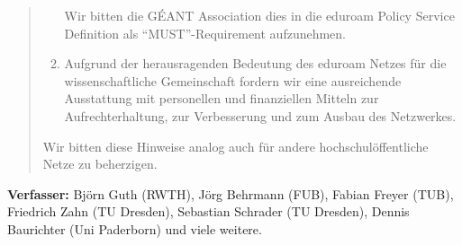 \documentclass[12pt,oneside]{scrartcl}
\begin{document}
\begin{quote}
\begin{enumerate}
    Wir bitten die GÉANT Association dies in die eduroam Policy Service Definition
    als ``MUST''-Requirement aufzunehmen.

  \item Aufgrund der herausragenden Bedeutung des eduroam Netzes für die
    wissenschaftliche Gemeinschaft fordern wir eine ausreichende Ausstattung mit
    personellen und finanziellen Mitteln zur Aufrechterhaltung, zur Verbesserung
    und zum Ausbau des Netzwerkes.
  \end{enumerate}

  Wir bitten diese Hinweise analog auch für andere hochschulöffentliche Netze zu
  beherzigen.

\end{quote}

\vspace{1cm}
\textbf{Verfasser:} Björn Guth (RWTH), Jörg Behrmann (FUB), Fabian Freyer (TUB),
Friedrich Zahn (TU Dresden), Sebastian Schrader (TU Dresden), Dennis Baurichter (Uni Paderborn)
und viele weitere.
\end{document}
